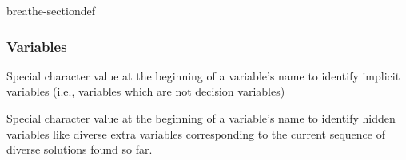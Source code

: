 \documentclass[letterpaper,10pt,openany,oneside,english]{sphinxmanual}
\begin{document}
\begin{sphinxuseclass}{breathe-sectiondef}\subsubsection*{Variables}

\begin{fulllineitems}
\label{\detokenize{ref/ref_cpp:_CPPv416IMPLICIT_VAR_TAG}}\label{\detokenize{ref/ref_cpp:_CPPv316IMPLICIT_VAR_TAG}}\label{\detokenize{ref/ref_cpp:_CPPv216IMPLICIT_VAR_TAG}}\label{\detokenize{ref/ref_cpp:IMPLICIT_VAR_TAG__stringC}}
\pysigstartsignatures
\pysigstartmultiline
{}
\pysigstopmultiline
\pysigstopsignatures
\sphinxAtStartPar
Special character value at the beginning of a variable’s name to identify implicit variables (i.e., variables which are not decision variables) 

\end{fulllineitems}


\begin{fulllineitems}
\label{\detokenize{ref/ref_cpp:_CPPv414HIDDEN_VAR_TAG}}\label{\detokenize{ref/ref_cpp:_CPPv314HIDDEN_VAR_TAG}}\label{\detokenize{ref/ref_cpp:_CPPv214HIDDEN_VAR_TAG}}\label{\detokenize{ref/ref_cpp:HIDDEN_VAR_TAG__stringC}}
\pysigstartsignatures
\pysigstartmultiline
{}
\pysigstopmultiline
\pysigstopsignatures
\sphinxAtStartPar
Special character value at the beginning of a variable’s name to identify hidden variables like diverse extra variables corresponding to the current sequence of diverse solutions found so far. 

\end{fulllineitems}


\end{sphinxuseclass}
\end{document}
